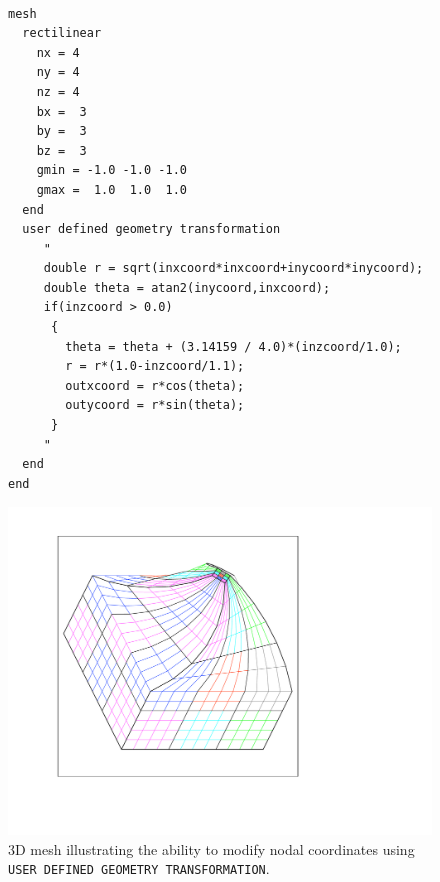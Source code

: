 \begin{figure}[t]
  \centering
    \begin{minipage}{0.3\linewidth}
{\ttfamily \begin{verbatim}






mesh
  rectilinear
    nx = 4
    ny = 4
    nz = 4
    bx =  3
    by =  3
    bz =  3
    gmin = -1.0 -1.0 -1.0
    gmax =  1.0  1.0  1.0
  end
  user defined geometry transformation
     "
     double r = sqrt(inxcoord*inxcoord+inycoord*inycoord);
     double theta = atan2(inycoord,inxcoord);
     if(inzcoord > 0.0)
      {
        theta = theta + (3.14159 / 4.0)*(inzcoord/1.0);
        r = r*(1.0-inzcoord/1.1);
        outxcoord = r*cos(theta);
        outycoord = r*sin(theta);
      }
     "
  end
end
\end{verbatim}}
    \end{minipage}%
    \hfill
    \begin{minipage}[t]{0.65\linewidth}
        \includegraphics[width=4.8in]{figures/3d_warped_geometry_white_bg}
    \end{minipage}
 \caption [3D Geometry Transformation Example]{3D mesh illustrating the ability to modify nodal coordinates using \texttt{USER
      DEFINED GEOMETRY TRANSFORMATION}.}
    \label{fig:3d_transform_example}
\end{figure}


